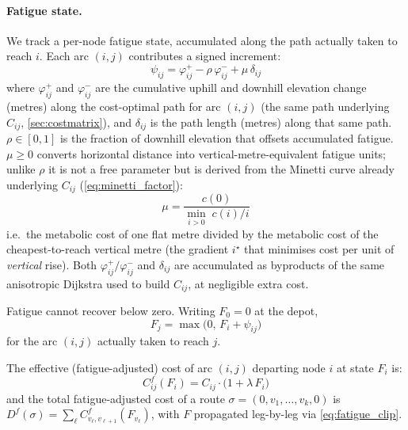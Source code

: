 \documentclass[11pt,a4paper]{article}
\begin{document}
\paragraph{Fatigue state.}
We track a per-node fatigue state, accumulated along the path actually taken to reach $i$.
Each arc $(i,j)$ contributes a signed increment:
\begin{equation}
  \psi_{ij} = \varphi^+_{ij} - \rho\, \varphi^-_{ij} + \mu\, \delta_{ij}
  \label{eq:psi}
\end{equation}
where $\varphi^+_{ij}$ and $\varphi^-_{ij}$ are the cumulative uphill and downhill elevation change (metres) along the cost-optimal path for arc $(i,j)$ (the same path underlying $C_{ij}$, \cref{sec:costmatrix}), and $\delta_{ij}$ is the path length (metres) along that same path.
$\rho \in [0,1]$ is the fraction of downhill elevation that offsets accumulated fatigue.
$\mu \geq 0$ converts horizontal distance into vertical-metre-equivalent fatigue units; unlike $\rho$ it is not a free parameter but is derived from the Minetti curve already underlying $C_{ij}$ (\cref{eq:minetti_factor}):
\begin{equation}
  \mu = \dfrac{c(0)}{\min_{i > 0}\; c(i)/i}
  \label{eq:mu}
\end{equation}
i.e.\ the metabolic cost of one flat metre divided by the metabolic cost of the cheapest-to-reach vertical metre (the gradient $i^\star$ that minimises cost per unit of \emph{vertical} rise).
Both $\varphi^+_{ij}/\varphi^-_{ij}$ and $\delta_{ij}$ are accumulated as byproducts of the same anisotropic Dijkstra used to build $C_{ij}$, at negligible extra cost.

Fatigue cannot recover below zero.
Writing $F_0 = 0$ at the depot,
\begin{equation}
  F_j = \max\bigl(0,\, F_i + \psi_{ij}\bigr)
  \label{eq:fatigue_clip}
\end{equation}
for the arc $(i,j)$ actually taken to reach $j$.

The effective (fatigue-adjusted) cost of arc $(i,j)$ departing node $i$ at state $F_i$ is:
\begin{equation}
  C^f_{ij}(F_i) = C_{ij} \cdot \bigl(1 + \lambda\, F_i\bigr)
  \label{eq:fatigue_cost}
\end{equation}
and the total fatigue-adjusted cost of a route $\sigma = (0, v_1, \ldots, v_k, 0)$ is $D^f(\sigma) = \sum_{\ell} C^f_{v_\ell, v_{\ell+1}}(F_{v_\ell})$, with $F$ propagated leg-by-leg via \cref{eq:fatigue_clip}.
\end{document}
